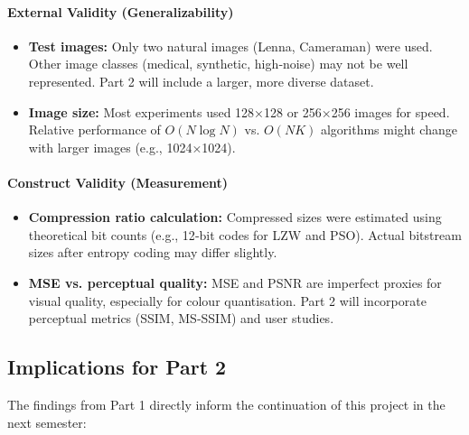 \paragraph{External Validity (Generalizability)}
\begin{itemize}
    \item \textbf{Test images:} Only two natural images (Lenna, Cameraman) were used. Other image classes (medical, synthetic, high‑noise) may not be well represented. Part 2 will include a larger, more diverse dataset.
    \item \textbf{Image size:} Most experiments used 128×128 or 256×256 images for speed. Relative performance of \(O(N \log N)\) vs. \(O(NK)\) algorithms might change with larger images (e.g., 1024×1024).
\end{itemize}

\paragraph{Construct Validity (Measurement)}
\begin{itemize}
    \item \textbf{Compression ratio calculation:} Compressed sizes were estimated using theoretical bit counts (e.g., 12‑bit codes for LZW and PSO). Actual bitstream sizes after entropy coding may differ slightly.
    \item \textbf{MSE vs. perceptual quality:} MSE and PSNR are imperfect proxies for visual quality, especially for colour quantisation. Part 2 will incorporate perceptual metrics (SSIM, MS‑SSIM) and user studies.
\end{itemize}

\subsection{Implications for Part 2}

The findings from Part 1 directly inform the continuation of this project in the next semester:

